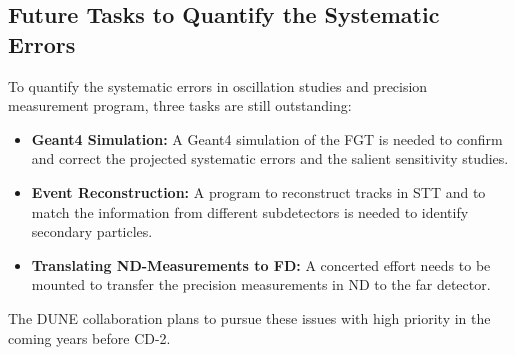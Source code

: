 \subsection{Future Tasks to Quantify the Systematic Errors}
\label{cdrsec:detectors-nd-ref-fgt-req-future} 

To quantify the systematic errors in oscillation studies and precision measurement
program, three tasks are still outstanding:\begin{itemize}
    \item {\bf Geant4 Simulation:} A Geant4 simulation of the FGT is
      needed to confirm and correct the projected systematic errors
      and the salient sensitivity studies.
     \item {\bf Event Reconstruction:} A program to reconstruct tracks
       in STT and to match the information from different
       subdetectors is needed to identify secondary particles.
     \item {\bf Translating ND-Measurements to FD:} A concerted effort
       needs to be mounted to transfer the precision measurements in
       ND to the far detector.
\end{itemize}    
The DUNE collaboration plans to pursue these issues with high priority
in the coming years before CD-2.
